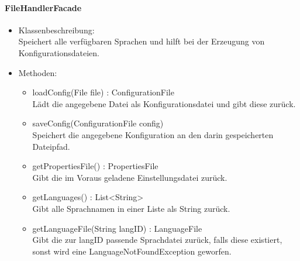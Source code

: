 \documentclass[parskip=full]{scrartcl}
\begin{document}
\paragraph{FileHandlerFacade}
\begin{itemize}
\item Klassenbeschreibung: \\
Speichert alle verfügbaren Sprachen und hilft bei der Erzeugung von Konfigurationsdateien.
\item Methoden: \\
\begin{itemize}
\item loadConfig(File file) : ConfigurationFile \\
Lädt die angegebene Datei als Konfigurationsdatei und gibt diese zurück.
\item saveConfig(ConfigurationFile config) \\
Speichert die angegebene Konfiguration an den darin gespeicherten Dateipfad.
\item getPropertiesFile() : PropertiesFile \\
Gibt die im Voraus geladene Einstellungsdatei zurück.
\item getLanguages() : List<String> \\
Gibt alle Sprachnamen in einer Liste als String zurück.
\item getLanguageFile(String langID) : LanguageFile \\
Gibt die zur langID passende Sprachdatei zurück, falls diese existiert,
sonst wird eine LanguageNotFoundException geworfen.
\end{itemize}
\end{itemize}
\end{document}
